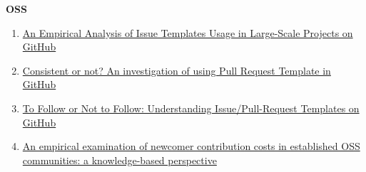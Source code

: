 \documentclass[source/paper/main.tex]{subfiles}
\begin{document}
\textbf{OSS}
\begin{enumerate}
    \item \hyperlink{https://dl.acm.org/doi/10.1145/3643673}{An Empirical Analysis of Issue Templates Usage in Large-Scale Projects on GitHub}
    \item \hyperlink{https://doi.org/10.1016/j.infsof.2021.106797}{Consistent or not? An investigation of using Pull Request Template in GitHub}
    \item \hyperlink{https://doi.org/10.1109/TSE.2022.3224053}{To Follow or Not to Follow: Understanding Issue/Pull-Request Templates on GitHub}
    \item \hyperlink{source/literature/e2120n2.pdf}{An empirical examination of newcomer contribution costs in established OSS communities: a knowledge-based perspective}
\end{enumerate}
\end{document}
